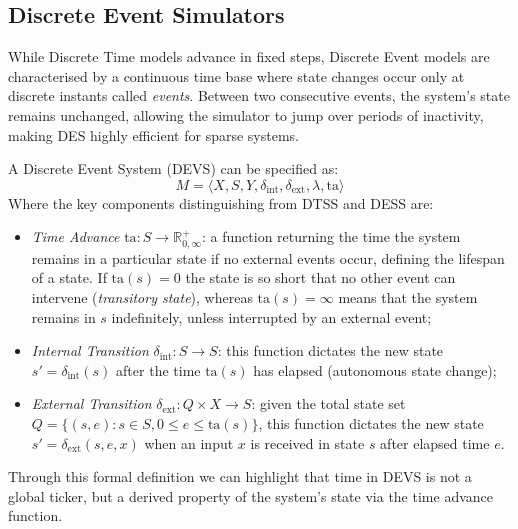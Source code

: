 \subsection{Discrete Event Simulators}\label{ssec:devs}
While Discrete Time models advance in fixed steps, Discrete Event models are
characterised by a continuous time base where state changes occur only at
discrete instants called \emph{events}. Between two consecutive events, the
system's state remains unchanged, allowing the simulator to jump over periods
of inactivity, making \ac{DES} highly efficient for sparse systems.

A Discrete Event System (DEVS) can be specified as:
%
\begin{equation}
	M = \langle X, S, Y, \delta_{\text{int}}, \delta_{\text{ext}}, \lambda, \text{ta} \rangle
\end{equation}
%
Where the key components distinguishing from DTSS and DESS are:
\begin{itemize}
	\item \emph{Time Advance} $\text{ta}: S \rightarrow \mathbb{R}^+_{0,
		      \infty}$: a function returning the time the system remains in a
	      particular state if no external events occur, defining the
	      lifespan of a state. If $\text{ta}(s) = 0$ the state is so
	      short that no other event can intervene (\emph{transitory
		      state}), whereas $\text{ta}(s) = \infty$ means that the system
	      remains in $s$ indefinitely, unless interrupted by an external
	      event;
	\item \emph{Internal Transition} $\delta_{\text{int}}: S \rightarrow S$:
	      this function dictates the new state $s' = \delta_{\text{int}}(s)$
	      after the time $\text{ta}(s)$ has elapsed (autonomous state change);
	\item \emph{External Transition} $\delta_{\text{ext}}: Q \times X
		      \rightarrow S$: given the total state set $Q = \{ (s, e) : s
		      \in S, 0 \leq e \leq \text{ta}(s)\}$, this function dictates
	      the new state $s' = \delta_{\text{ext}}(s, e, x)$ when an input
	      $x$ is received in state $s$ after elapsed time $e$.
\end{itemize}
Through this formal definition we can highlight that time in DEVS is not a
global ticker, but a derived property of the system's state via the time
advance function.

